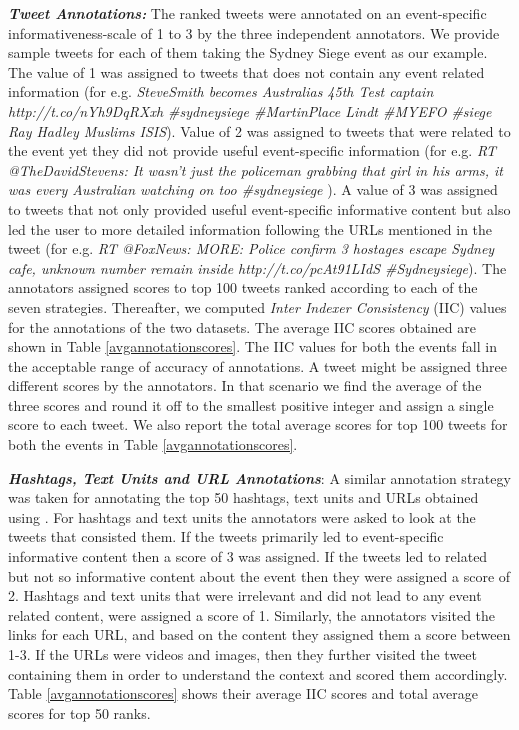 \noindent \textit{\textbf{Tweet Annotations:}} The ranked tweets were annotated on an event-specific informativeness-scale of 1 to 3 by the three independent annotators. We provide sample tweets for each of them taking the Sydney Siege event as our example. The value of 1 was assigned to tweets that does not contain any event related information (for e.g. \textit{\scriptsize SteveSmith becomes Australias 45th Test captain http://t.co/nYh9DqRXxh \#sydneysiege \#MartinPlace Lindt \#MYEFO \#siege Ray Hadley Muslims ISIS}). Value of 2 was assigned to tweets that were related to the event yet they did not provide useful event-specific information (for e.g. \textit{\scriptsize RT @TheDavidStevens: It wasn't just the policeman grabbing that girl in his arms, it was every Australian watching on too \#sydneysiege} ). A value of 3 was assigned to tweets that not only provided useful event-specific informative content but also led the user to more detailed information following the URLs mentioned in the tweet (for e.g. \textit{\scriptsize RT @FoxNews: MORE: Police confirm 3 hostages escape Sydney cafe, unknown number remain inside http://t.co/pcAt91LIdS \#Sydneysiege}).  The annotators assigned scores to top 100 tweets ranked according to each of the seven strategies. Thereafter, we computed \textit{Inter Indexer Consistency} (IIC) values \cite{rolling1981indexing} for the annotations of the two datasets. The average IIC scores obtained are shown in Table \ref{avgannotationscores}. The IIC values for both the events fall in the acceptable range of accuracy of annotations. A tweet might be assigned three different scores by the annotators. In that scenario we find the average of the three scores and round it off to the smallest positive integer and assign a single score to each tweet. We also report the total average scores for top 100 tweets for both the events in Table \ref{avgannotationscores}. 

\noindent \textit{\textbf{Hashtags, Text Units and URL Annotations}}: A similar annotation strategy was taken for annotating the top 50 hashtags, text units and URLs obtained using . For hashtags and text units the annotators were asked to look at the tweets that consisted them. If the tweets primarily led to event-specific informative content then a score of 3 was assigned. If the tweets led to related but not so informative content about the event then they were assigned a score of 2. Hashtags and text units that were irrelevant and did not lead to any event related content, were assigned a score of 1. Similarly, the annotators visited the links for each URL, and based on the content they assigned them a score between 1-3. If the URLs were videos and images, then they further visited the tweet containing them in order to understand the context and scored them accordingly. Table \ref{avgannotationscores} shows their average IIC scores and total average scores for top 50 ranks. 

